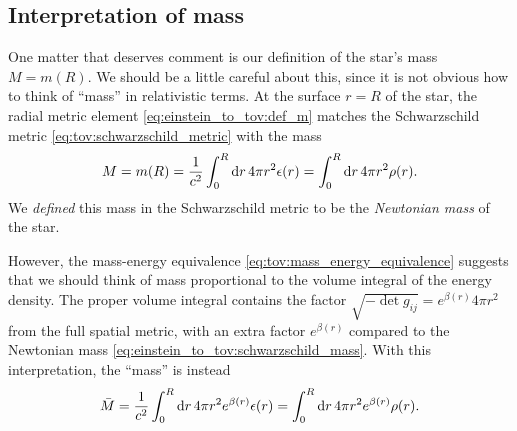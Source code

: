 \subsection*{Interpretation of mass}

One matter that deserves comment is our definition of the star's mass $M = m(R)$.
We should be a little careful about this, since it is not obvious how to think of ``mass'' in relativistic terms.
At the surface $r=R$ of the star, the radial metric element \eqref{eq:einstein_to_tov:def_m} matches the Schwarzschild metric \eqref{eq:tov:schwarzschild_metric} with the mass
\begin{equation}
	M = m(R) = \frac{1}{c^2} \integral{4 \pi r^2 \epsilon(r)}{r}{0}{R} = \integral{4 \pi r^2 \rho(r)}{r}{0}{R} .
	\label{eq:einstein_to_tov:schwarzschild_mass}
\end{equation}
We \emph{defined} this mass in the Schwarzschild metric to be the \emph{Newtonian mass} of the star.

However, the mass-energy equivalence \eqref{eq:tov:mass_energy_equivalence} suggests that we should think of mass proportional to the volume integral of the energy density.
The proper volume integral contains the factor $\sqrt{-\det{g_{ij}}} = e^{\beta(r)} 4 \pi r^2$ from the full spatial metric, with an extra factor $e^{\beta(r)}$ compared to the Newtonian mass \eqref{eq:einstein_to_tov:schwarzschild_mass}.
With this interpretation, the ``mass'' is instead
\begin{equation}
	\bar{M} = \frac{1}{c^2} \integral{4 \pi r^2 e^{\beta(r)} \epsilon(r)}{r}{0}{R}
	        = \integral{4 \pi r^2 e^{\beta(r)} \rho(r)}{r}{0}{R} .
\label{eq:einstein_to_tov:alternative_mass}
\end{equation}

